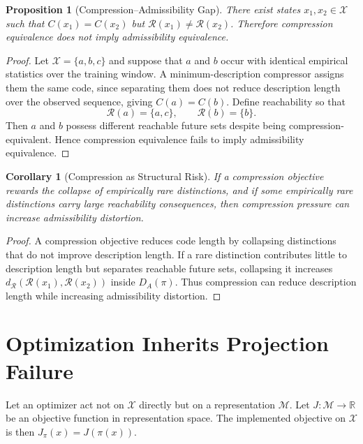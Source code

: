 \documentclass[12pt,a4paper]{article}
\theoremstyle{plain}
\newtheorem{proposition}{Proposition}
\newtheorem{corollary}{Corollary}
\theoremstyle{definition}
\theoremstyle{remark}
\begin{document}
\begin{proposition}[Compression--Admissibility Gap]
There exist states $x_1, x_2 \in \mathcal{X}$ such that $C(x_1) = C(x_2)$
but $\mathcal{R}(x_1) \neq \mathcal{R}(x_2)$. Therefore compression
equivalence does not imply admissibility equivalence.
\end{proposition}

\begin{proof}
Let $\mathcal{X} = \{a, b, c\}$ and suppose that $a$ and $b$ occur with
identical empirical statistics over the training window. A minimum-description
compressor assigns them the same code, since separating them does not reduce
description length over the observed sequence, giving $C(a) = C(b)$. Define
reachability so that
\[
  \mathcal{R}(a) = \{a, c\}, \qquad \mathcal{R}(b) = \{b\}.
\]
Then $a$ and $b$ possess different reachable future sets despite being
compression-equivalent. Hence compression equivalence fails to imply
admissibility equivalence.
\end{proof}

\begin{corollary}[Compression as Structural Risk]
If a compression objective rewards the collapse of empirically rare
distinctions, and if some empirically rare distinctions carry large reachability
consequences, then compression pressure can increase admissibility distortion.
\end{corollary}

\begin{proof}
A compression objective reduces code length by collapsing distinctions that do
not improve description length. If a rare distinction contributes little to
description length but separates reachable future sets, collapsing it increases
$d_{\mathcal{R}}(\mathcal{R}(x_1), \mathcal{R}(x_2))$ inside $D_A(\pi)$.
Thus compression can reduce description length while increasing admissibility
distortion.
\end{proof}

\section{Optimization Inherits Projection Failure}

Let an optimizer act not on $\mathcal{X}$ directly but on a representation
$\mathcal{M}$. Let $J : \mathcal{M} \to \mathbb{R}$ be an objective function
in representation space. The implemented objective on $\mathcal{X}$ is then
$J_\pi(x) = J(\pi(x))$.
\end{document}

